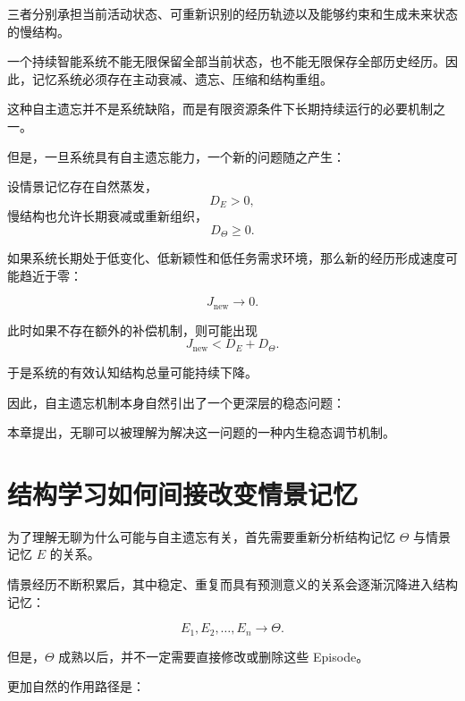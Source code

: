 三者分别承担当前活动状态、可重新识别的经历轨迹以及能够约束和生成未来状态的慢结构。

一个持续智能系统不能无限保留全部当前状态，也不能无限保存全部历史经历。因此，记忆系统必须存在主动衰减、遗忘、压缩和结构重组。

这种自主遗忘并不是系统缺陷，而是有限资源条件下长期持续运行的必要机制之一。

但是，一旦系统具有自主遗忘能力，一个新的问题随之产生：

\begin{statementbox}
\centering
{}
\end{statementbox}

设情景记忆存在自然蒸发，
\[
D_E>0,
\]
慢结构也允许长期衰减或重新组织，
\[
D_\Theta\geq 0.
\]

如果系统长期处于低变化、低新颖性和低任务需求环境，那么新的经历形成速度可能趋近于零：

\[
J_{\mathrm{new}}\rightarrow 0.
\]

此时如果不存在额外的补偿机制，则可能出现
\[
J_{\mathrm{new}}
<
D_E+D_\Theta.
\]

于是系统的有效认知结构总量可能持续下降。

因此，自主遗忘机制本身自然引出了一个更深层的稳态问题：

\begin{statementbox}
\centering
{}
\end{statementbox}

本章提出，无聊可以被理解为解决这一问题的一种内生稳态调节机制。

\section{结构学习如何间接改变情景记忆}

为了理解无聊为什么可能与自主遗忘有关，首先需要重新分析结构记忆 $\Theta$ 与情景记忆 $E$ 的关系。

情景经历不断积累后，其中稳定、重复而具有预测意义的关系会逐渐沉降进入结构记忆：

\[
E_1,E_2,\ldots,E_n
\longrightarrow
\Theta.
\]

但是，$\Theta$ 成熟以后，并不一定需要直接修改或删除这些 Episode。

更加自然的作用路径是：

